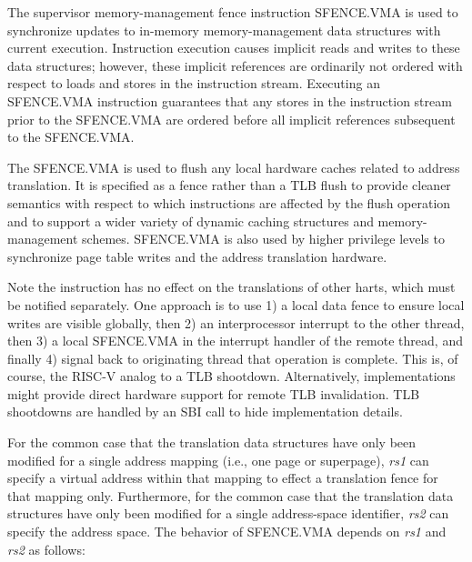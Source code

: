 The supervisor memory-management fence instruction SFENCE.VMA is used to
synchronize updates to in-memory memory-management data structures with
current execution.  Instruction execution causes implicit reads and writes to
these data structures; however, these implicit references are ordinarily not
ordered with respect to loads and stores in the instruction stream.  Executing
an SFENCE.VMA instruction guarantees that any stores in the instruction stream
prior to the SFENCE.VMA are ordered before all implicit references subsequent
to the SFENCE.VMA.

\begin{commentary}
The SFENCE.VMA is used to flush any local hardware caches related to
address translation.  It is specified as a fence rather than a TLB
flush to provide cleaner semantics with respect to which instructions
are affected by the flush operation and to support a wider variety of
dynamic caching structures and memory-management schemes.  SFENCE.VMA
is also used by higher privilege levels to synchronize page table
writes and the address translation hardware.
\end{commentary}

\begin{commentary}
Note the instruction has no effect on the translations of other harts,
which must be notified separately.  One approach is to use 1)
a local data fence to ensure local writes are visible globally, then
2) an interprocessor interrupt to the other thread, then 3) a local
SFENCE.VMA in the interrupt handler of the remote thread, and finally
4) signal back to originating thread that operation is complete.  This
is, of course, the RISC-V analog to a TLB shootdown.  Alternatively,
implementations might provide direct hardware support for remote TLB
invalidation.  TLB shootdowns are handled by an SBI call to hide
implementation details.
\end{commentary}

For the common case that the translation data structures have only been
modified for a single address mapping (i.e., one page or superpage), {\em rs1}
can specify a virtual address within that mapping to effect a translation
fence for that mapping only.  Furthermore, for the common case that the
translation data structures have only been modified for a single address-space
identifier, {\em rs2} can specify the address space.  The behavior of
SFENCE.VMA depends on {\em rs1} and {\em rs2} as follows:

